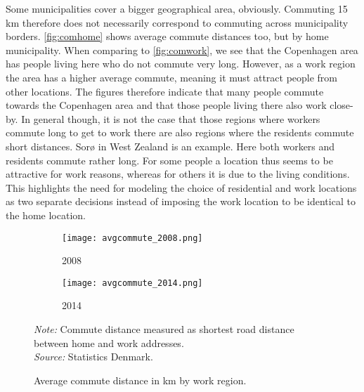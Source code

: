 Some municipalities cover a bigger geographical area, obviously. Commuting 15 km therefore does not necessarily correspond to commuting across municipality borders. \autoref{fig:comhome} shows average commute distances too, but by home municipality. When comparing to \autoref{fig:comwork}, we see that the Copenhagen area has people living here who do not commute very long. However, as a work region the area has a higher average commute, meaning it must attract people from other locations. The figures therefore indicate that many people commute towards the Copenhagen area and that those people living there also work close-by. In general though, it is not the case that those regions where workers commute long to get to work there are also regions where the residents commute short distances. Sorø in West Zealand is an example. Here both workers and residents commute rather long. For some people a location thus seems to be attractive for work reasons, whereas for others it is due to the living conditions. This highlights the need for modeling the choice of residential and work locations as two separate decisions instead of imposing the work location to be identical to the home location. 

\begin{figure}
\centering
\begin{minipage}{0.85\textwidth}
\begin{subfigure}{.50\textwidth}
  \centering
  \texttt{[image: avgcommute\_2008.png]}
  \caption{\footnotesize{2008}}
  \label{fig:sub1}
\end{subfigure}%
\begin{subfigure}{.50\textwidth}
  \centering
  \texttt{[image: avgcommute\_2014.png]}
  \caption{\footnotesize{2014}}
  \label{fig:sub2}
\end{subfigure}
{\tiny \emph{Note:} Commute distance measured as shortest road distance between home and work addresses. \\ \emph{Source:} Statistics Denmark.\par}
\end{minipage}
\caption{Average commute distance in km by work region.}
\label{fig:comwork}
\end{figure}

